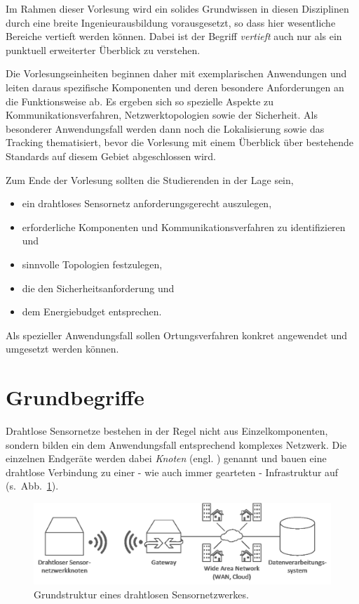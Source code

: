 Im Rahmen dieser Vorlesung wird ein solides Grundwissen in diesen Disziplinen durch eine breite Ingenieurausbildung vorausgesetzt, so dass hier wesentliche Bereiche vertieft werden können. Dabei ist der Begriff \emph{vertieft} auch nur als ein punktuell erweiterter Überblick zu verstehen. 

Die Vorlesungseinheiten beginnen daher mit exemplarischen Anwendungen und leiten daraus spezifische Komponenten und deren besondere Anforderungen an die Funktionsweise ab. Es ergeben sich so spezielle Aspekte zu Kommunikationsverfahren, Netzwerktopologien sowie der Sicherheit. Als besonderer Anwendungsfall werden dann noch die Lokalisierung sowie das Tracking thematisiert, bevor die Vorlesung mit einem Überblick über bestehende Standards auf diesem Gebiet abgeschlossen wird.

Zum Ende der Vorlesung sollten die Studierenden in der Lage sein, 
\begin{itemize}
	\item ein drahtloses Sensornetz anforderungsgerecht auszulegen, 
	\item erforderliche Komponenten und Kommunikationsverfahren zu identifizieren und
	\item sinnvolle Topologien festzulegen,
	\item die den Sicherheitsanforderung und
	\item dem Energiebudget entsprechen.
\end{itemize} 
Als spezieller Anwendungsfall sollen Ortungsverfahren konkret angewendet und umgesetzt werden können.

\section{Grundbegriffe}

Drahtlose Sensornetze bestehen in der Regel nicht aus Einzelkomponenten, sondern bilden ein dem Anwendungsfall entsprechend komplexes Netzwerk. Die einzelnen Endgeräte werden dabei \emph{Knoten} (engl. \emph{}) genannt und bauen eine drahtlose Verbindung zu einer - wie auch immer gearteten - Infrastruktur auf (s.~Abb.~\ref{fig_wsn_struktur}). 

\begin{figure}[!h]
\centering
\includegraphics[width=12cm]{your_content_folder/your_figures/fig_intro/WSN_Struktur.png}
\caption{Grundstruktur eines drahtlosen Sensornetzwerkes.}
\label{fig_wsn_struktur}
\end{figure}

